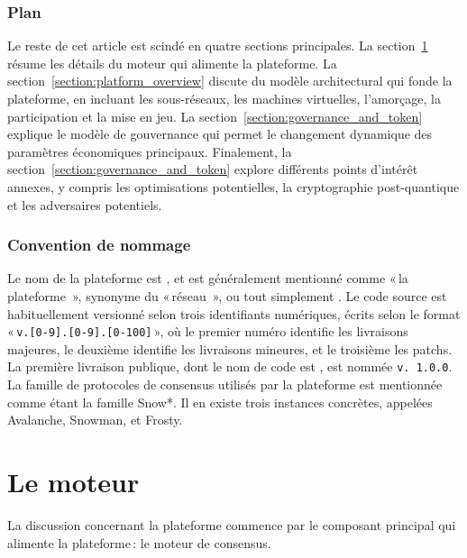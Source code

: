 \documentclass[runningheads,francais,a4paper]{llncs}
\begin{document}
\subsubsection{Plan}
Le reste de cet article est scindé en quatre sections principales. La section~\ref{section:engine} résume les détails du
moteur qui alimente la plateforme. La section~\ref{section:platform_overview} discute du modèle architectural qui fonde
la plateforme, en incluant les sous-réseaux, les machines virtuelles, l'amorçage, la participation et la mise en jeu.
La section~\ref{section:governance_and_token} explique le modèle de gouvernance qui permet le changement dynamique des
paramètres économiques principaux. Finalement, la section~\ref{section:governance_and_token} explore différents points
d'intérêt annexes, y compris les optimisations potentielles, la cryptographie post-quantique et les adversaires
potentiels.

\subsubsection{Convention de nommage}
Le nom de la plateforme est \AVAPlatformName{}, et est généralement mentionné comme
«\,la plateforme \AVAPlatformName{}\,», synonyme du  «\,réseau \AVAPlatformName{}\,», ou tout simplement
\AVAPlatformName{}. Le code source est habituellement versionné selon trois identifiants numériques, écrits selon le format
«\,\texttt{v.[0-9].[0-9].[0-100]}\,», où le premier numéro identifie les livraisons majeures, le deuxième identifie les
livraisons mineures, et le troisième les patchs. La première livraison publique, dont le nom de code est
\AVAPlatformNameFirstRelease{}, est nommée \texttt{v. 1.0.0}. La famille de protocoles de consensus utilisés par la
plateforme \AVAPlatformName{} est mentionnée comme étant la famille Snow*. Il en existe trois instances concrètes,
appelées Avalanche, Snowman, et Frosty.

\section{Le moteur}
\label{section:engine}
La discussion concernant la plateforme \AVAPlatformName{} commence par le composant principal qui alimente la
plateforme\,: le moteur de consensus.
\end{document}
